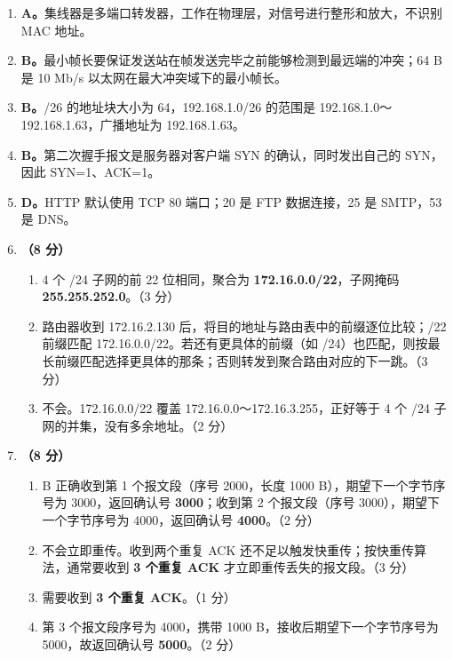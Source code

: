 \documentclass[a4paper,11pt]{article}
\begin{document}

\begin{enumerate}[start=13, label=\textbf{\arabic*.}, leftmargin=2.4em, itemsep=0.45em]

\item \textbf{A。}集线器是多端口转发器，工作在物理层，对信号进行整形和放大，不识别 MAC 地址。

\item \textbf{B。}最小帧长要保证发送站在帧发送完毕之前能够检测到最远端的冲突；64 B 是 10 Mb/s 以太网在最大冲突域下的最小帧长。

\item \textbf{B。}/26 的地址块大小为 64，192.168.1.0/26 的范围是 192.168.1.0～192.168.1.63，广播地址为 192.168.1.63。

\item \textbf{B。}第二次握手报文是服务器对客户端 SYN 的确认，同时发出自己的 SYN，因此 SYN=1、ACK=1。

\item \textbf{D。}HTTP 默认使用 TCP 80 端口；20 是 FTP 数据连接，25 是 SMTP，53 是 DNS。

\item \textbf{（8 分）}
\begin{enumerate}[label=（\arabic*）, leftmargin=2.2em, itemsep=1pt]
  \item 4 个 /24 子网的前 22 位相同，聚合为 \textbf{172.16.0.0/22}，子网掩码 \textbf{255.255.252.0}。\hfill（3 分）
  \item 路由器收到 172.16.2.130 后，将目的地址与路由表中的前缀逐位比较；/22 前缀匹配 172.16.0.0/22。若还有更具体的前缀（如 /24）也匹配，则按最长前缀匹配选择更具体的那条；否则转发到聚合路由对应的下一跳。\hfill（3 分）
  \item 不会。172.16.0.0/22 覆盖 172.16.0.0～172.16.3.255，正好等于 4 个 /24 子网的并集，没有多余地址。\hfill（2 分）
\end{enumerate}

\item \textbf{（8 分）}
\begin{enumerate}[label=（\arabic*）, leftmargin=2.2em, itemsep=1pt]
  \item B 正确收到第 1 个报文段（序号 2000，长度 1000 B），期望下一个字节序号为 3000，返回确认号 \textbf{3000}；收到第 2 个报文段（序号 3000），期望下一个字节序号为 4000，返回确认号 \textbf{4000}。\hfill（2 分）
  \item 不会立即重传。收到两个重复 ACK 还不足以触发快重传；按快重传算法，通常要收到 \textbf{3 个重复 ACK} 才立即重传丢失的报文段。\hfill（3 分）
  \item 需要收到 \textbf{3 个重复 ACK}。\hfill（1 分）
  \item 第 3 个报文段序号为 4000，携带 1000 B，接收后期望下一个字节序号为 5000，故返回确认号 \textbf{5000}。\hfill（2 分）
\end{enumerate}


\end{enumerate}
\end{document}
